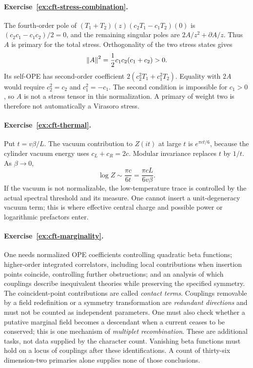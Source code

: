 \paragraph{Exercise~\ref{ex:cft-stress-combination}.}
\label{sol:ex:cft-stress-combination}
The fourth-order pole of $(T_1+T_2)(z)
(c_2T_1-c_1T_2)(0)$ is
$(c_2c_1-c_1c_2)/2=0$, and the remaining singular poles
are $2A/z^2+\partial A/z$. Thus $A$ is primary for the
total stress. Orthogonality of the two stress states gives
\[
 \left\lVert A\right\rVert^2=\frac12c_1c_2(c_1+c_2)>0.
\]
Its self-OPE has second-order coefficient
$2(c_2^2T_1+c_1^2T_2)$. Equality with $2A$ would require
$c_2^2=c_2$ and $c_1^2=-c_1$. The second condition is impossible
for $c_1>0$, so $A$ is not a stress tensor in this normalization.
A primary of weight two is therefore not automatically a
Virasoro stress.



\paragraph{Exercise~\ref{ex:cft-thermal}.}
\label{sol:ex:cft-thermal}
Put $t=v\beta/L$. The vacuum contribution to $Z(it)$ at large
$t$ is $e^{\pi ct/6}$, because the cylinder vacuum energy
uses $c_L+c_R=2c$. Modular invariance replaces $t$ by $1/t$.
As $\beta\to0$,
\[
 \log Z\sim\frac{\pi c}{6t}=\frac{\pi cL}{6v\beta}.
\]
If the vacuum is not normalizable, the low-temperature trace is
controlled by the actual spectral threshold and its measure.
One cannot insert a unit-degeneracy vacuum term; this is where
effective central charge and possible power or logarithmic
prefactors enter.



\paragraph{Exercise~\ref{ex:cft-marginality}.}
\label{sol:ex:cft-marginality}
One needs normalized OPE coefficients controlling quadratic beta
functions; higher-order integrated correlators, including local
contributions when insertion points coincide, controlling further
obstructions; and an analysis of which couplings describe inequivalent
theories while preserving the specified symmetry.
The coincident-point contributions are called \emph{contact terms}.
Couplings removable by a field redefinition or a symmetry
transformation are \emph{redundant directions} and must not be
counted as independent parameters. One must also check whether a
putative marginal field becomes a descendant when a current ceases
to be conserved; this is one mechanism of \emph{multiplet
recombination}. These are additional tasks, not data supplied by
the character count.
Vanishing beta functions must hold on a locus of couplings after
these identifications. A count of thirty-six dimension-two
primaries alone supplies none of those conclusions.

